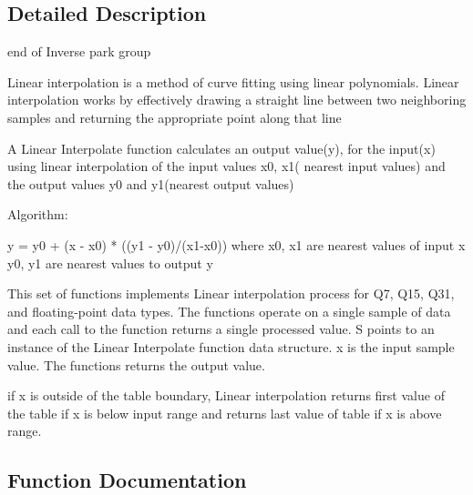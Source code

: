 \subsection{Detailed Description}
end of Inverse park group

Linear interpolation is a method of curve fitting using linear polynomials. Linear interpolation works by effectively drawing a straight line between two neighboring samples and returning the appropriate point along that line

\begin{DoxyParagraph}{}
 
\end{DoxyParagraph}
\begin{DoxyParagraph}{}
A Linear Interpolate function calculates an output value(y), for the input(x) using linear interpolation of the input values x0, x1( nearest input values) and the output values y0 and y1(nearest output values)
\end{DoxyParagraph}
\begin{DoxyParagraph}{Algorithm\+:}

\begin{DoxyPre}
      y = y0 + (x - x0) * ((y1 - y0)/(x1-x0))
      where x0, x1 are nearest values of input x
            y0, y1 are nearest values to output y
\end{DoxyPre}

\end{DoxyParagraph}
\begin{DoxyParagraph}{}
This set of functions implements Linear interpolation process for Q7, Q15, Q31, and floating-\/point data types. The functions operate on a single sample of data and each call to the function returns a single processed value. {\ttfamily S} points to an instance of the Linear Interpolate function data structure. {\ttfamily x} is the input sample value. The functions returns the output value.
\end{DoxyParagraph}
\begin{DoxyParagraph}{}
if x is outside of the table boundary, Linear interpolation returns first value of the table if x is below input range and returns last value of table if x is above range. 
\end{DoxyParagraph}


\subsection{Function Documentation}
\mbox{\label{group___linear_interpolate_ga5335f60532bab8cee1e7c22f76a41805}} 
